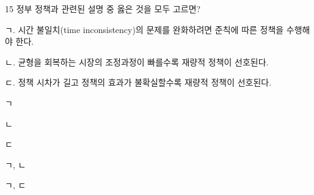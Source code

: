 \begin{question}{15}
정부 정책과 관련된 설명 중 옳은 것을 모두 고르면?
\begin{framedtext}
ㄱ. 시간 불일치(time inconsistency)의 문제를 완화하려면 준칙에 따른 정책을 수행해야 한다. \par
ㄴ. 균형을 회복하는 시장의 조정과정이 빠를수록 재량적 정책이 선호된다. \par
ㄷ. 정책 시차가 길고 정책의 효과가 불확실할수록 재량적 정책이 선호된다. \par
\end{framedtext}
\begin{choices}
  \item ㄱ
  \item ㄴ
  \item ㄷ
  \item ㄱ, ㄴ
  \item ㄱ, ㄷ
\end{choices}
\end{question}
